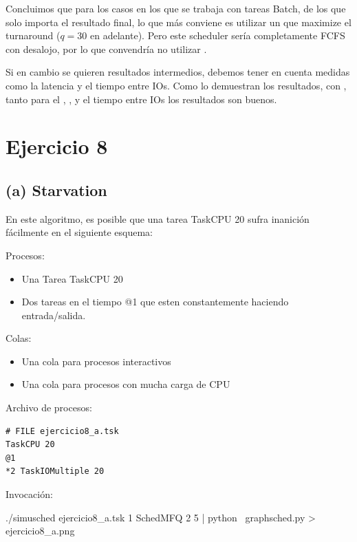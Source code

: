 Concluimos que para los casos en los que se trabaja con tareas Batch, de los que solo importa el resultado final, lo que m\'as conviene es utilizar un \quantum que maximize el turnaround ($q=30$ en adelante). Pero este scheduler ser\'ia completamente FCFS con desalojo, por lo que convendr\'ia no utilizar \rr.

Si en cambio se quieren resultados intermedios, debemos tener en cuenta medidas como la latencia y el tiempo entre IOs. Como lo demuestran los resultados, con , tanto para el \ta, \wt, \latencia y el tiempo entre IOs los resultados son buenos.

\newpage

\section{Ejercicio 8}

\subsection{(a) Starvation}

En este algoritmo, es posible que una tarea TaskCPU 20 sufra inanici\'on f\'acilmente en el siguiente esquema:

Procesos:
\begin{itemize}
 \item Una Tarea TaskCPU 20
 \item Dos tareas en el tiempo @1 que esten constantemente haciendo entrada/salida.
\end{itemize}

Colas:
\begin{itemize}
 \item Una cola para procesos interactivos
 \item Una cola para procesos con mucha carga de CPU
\end{itemize}

Archivo de procesos:

\begin{framed}
\begin{verbatim}
# FILE ejercicio8_a.tsk
TaskCPU 20
@1
*2 TaskIOMultiple 20
\end{verbatim}
\end{framed}

Invocaci\'on:

\begin{framed}
\begin{verbatimtab}
./simusched ejercicio8_a.tsk 1 SchedMFQ 2 5 | python \
    graphsched.py > ejercicio8_a.png
\end{verbatimtab}
\end{framed}

